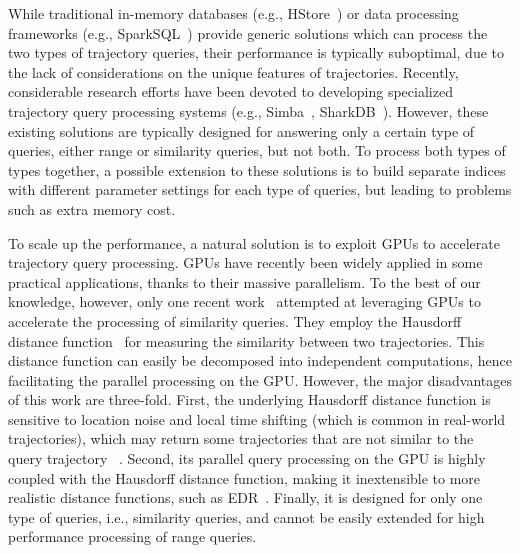 \documentclass[10pt,conference,letterpaper]{IEEEtran}
\begin{document}
While traditional in-memory databases (e.g., HStore~\cite{DBLP:journals/pvldb/KallmanKNPRZJMSZHA08}) or data processing frameworks (e.g., SparkSQL~\cite{DBLP:conf/sigmod/ArmbrustXLHLBMK15}) provide generic solutions which can process the two types of trajectory queries, their performance is typically suboptimal, due to the lack of considerations on the unique features of trajectories.
Recently, considerable research efforts have been devoted to developing specialized trajectory query processing systems (e.g., Simba~\cite{DBLP:conf/sigmod/XieL0LZG16}, SharkDB~\cite{DBLP:conf/cikm/WangZXZZS14}).
However, these existing solutions are typically designed for answering only a certain type of queries, either range or similarity queries, but not both. To process both types of types together, a possible extension to these solutions is to build separate indices with different parameter settings for each type of queries, but leading to problems such as extra memory cost.

To scale up the performance, a natural solution is to exploit GPUs to accelerate trajectory query processing. GPUs have recently been widely applied in some practical applications, thanks to their massive parallelism.
To the best of our knowledge, however, only one recent work~\cite{GPUTaxi} attempted at leveraging GPUs to accelerate the processing of similarity queries. They employ the Hausdorff distance function~\cite{munkres2000topology} for measuring the similarity between two trajectories.  This distance function can easily be decomposed into independent computations, hence facilitating the parallel processing on the GPU. However, the major disadvantages of this work are three-fold. First, the underlying Hausdorff distance function is sensitive to location noise and local time shifting (which is common in real-world trajectories), which may return some trajectories that are not similar to the query trajectory ~\cite{EDWP15}. Second, its parallel query processing on the GPU is highly coupled with the Hausdorff distance function, making it inextensible to more realistic distance functions, such as EDR~\cite{DBLP:conf/sigmod/ChenOO05}. Finally, it is designed for only one type of queries, i.e., similarity queries, and cannot be easily extended for high performance processing of range queries.
\end{document}
